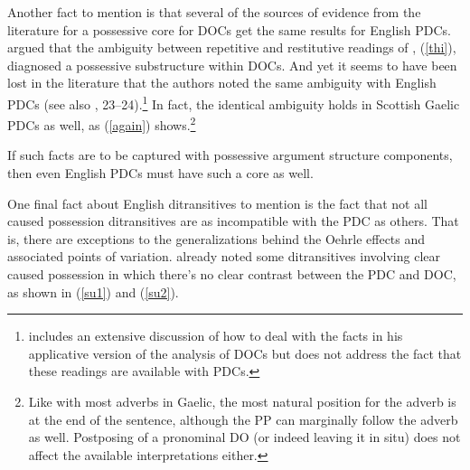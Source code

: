 \documentclass[output=paper,colorlinks,citecolor=brown]{langscibook}
\begin{document}
Another fact to mention is that several of the sources of evidence from the literature for a possessive core for DOCs get the same results for English PDCs. \citet{gt:Beck:2004} argued that the ambiguity between repetitive and restitutive readings of , (\ref{thi}), diagnosed a possessive substructure within DOCs. And yet it seems to have been lost in the literature that the authors noted  the same ambiguity with English PDCs (see also \citealt{gt:Ormazabal:2023}, 23--24).\footnote{\citet[550--555]{gt:Bruening:2010a} includes an extensive discussion of how to deal with the  facts in his applicative version of the analysis of DOCs but does not address the fact that these readings are available with PDCs.} In fact, the identical ambiguity holds in Scottish Gaelic PDCs as well, as (\ref{again}) shows.\footnote{Like with most adverbs in Gaelic, the most natural position for the adverb is at the end of the sentence, although the PP can marginally follow the adverb as well. Postposing of a pronominal DO (or indeed leaving it in situ) does not affect the available interpretations either.  }




\noindent If such facts are to be captured with possessive argument structure components, then even English PDCs must have such a core as well. 

One final fact about English ditransitives to mention is the fact that not all caused possession ditransitives are as incompatible with the PDC as others. That is, there are exceptions to the generalizations behind the Oehrle effects and associated points of variation. \citet{gt:Pesetsky:1995} already noted some ditransitives involving clear caused possession in which there's no clear contrast between the PDC and DOC, as shown in (\ref{su1}) and (\ref{su2}). 
\end{document}

